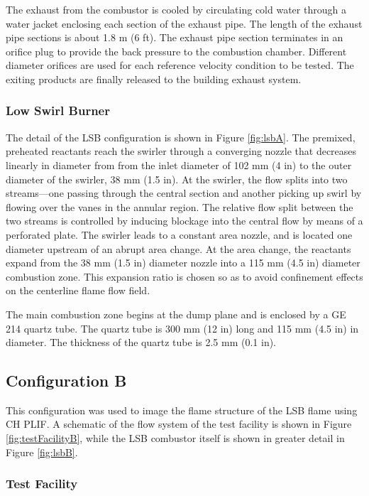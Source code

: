The exhaust from the combustor is cooled by circulating cold water through a water jacket enclosing each section of the exhaust pipe.
The length of the exhaust pipe sections is about 1.8 m (6 ft).
The exhaust pipe section terminates in an orifice plug to provide the back pressure to the combustion chamber.
Different diameter orifices are used for each reference velocity condition to be tested.
The exiting products are finally released to the building exhaust system.

\subsubsection{Low Swirl Burner}



The detail of the LSB configuration is shown in Figure \ref{fig:lsbA}.
The premixed, preheated reactants reach the swirler through a converging nozzle that decreases linearly in diameter from from the inlet diameter of 102 mm (4 in) to the outer diameter of the swirler, 38 mm (1.5 in).
At the swirler, the flow splits into two streams---one passing through the central section and another picking up swirl by flowing over the vanes in the annular region.
The relative flow split between the two streams is controlled by inducing blockage into the central flow by means of a perforated plate.
The swirler leads to a constant area nozzle, and is located one diameter upstream of an abrupt area change.
At the area change, the reactants expand from the 38 mm (1.5 in) diameter nozzle into a 115 mm (4.5 in) diameter combustion zone.
This expansion ratio is chosen so as to avoid confinement effects on the centerline flame flow field.\cite{1998-yegian}

The main combustion zone begins at the dump plane and is enclosed by a GE 214 quartz tube.
The quartz tube is 300 mm (12 in) long and 115 mm (4.5 in) in diameter.
The thickness of the quartz tube is 2.5 mm (0.1 in).

\subsection{Configuration B}

This configuration was used to image the flame structure of the LSB flame using CH PLIF.
A schematic of the flow system of the test facility is shown in Figure \ref{fig:testFacilityB}, while the LSB combustor itself is shown in greater detail in Figure \ref{fig:lsbB}.

\subsubsection{Test Facility}

